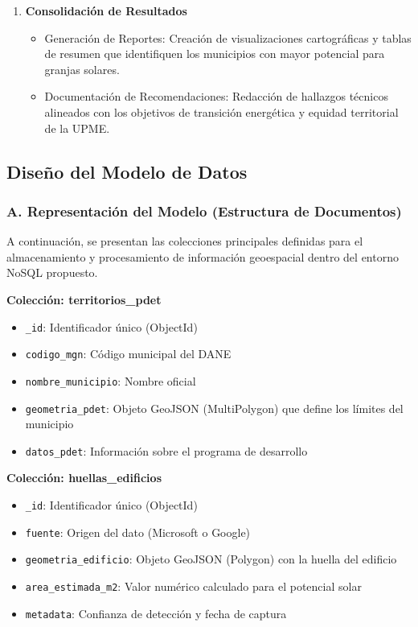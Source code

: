 \documentclass{article}
\begin{document}
\begin{enumerate}
    \item \textbf{Consolidación de Resultados}
    \begin{itemize}
        \item Generación de Reportes: Creación de visualizaciones cartográficas y tablas de resumen que identifiquen los municipios con mayor potencial para granjas solares.
        \item Documentación de Recomendaciones: Redacción de hallazgos técnicos alineados con los objetivos de transición energética y equidad territorial de la UPME.
    \end{itemize}
\end{enumerate}

\subsection{Diseño del Modelo de Datos}

\subsubsection{A. Representación del Modelo (Estructura de Documentos)}

A continuación, se presentan las colecciones principales definidas para el almacenamiento y procesamiento de información geoespacial dentro del entorno NoSQL propuesto.

\textbf{Colección: territorios\_pdet}

\begin{itemize}
    \item \texttt{\_id}: Identificador único (ObjectId)
    \item \texttt{codigo\_mgn}: Código municipal del DANE
    \item \texttt{nombre\_municipio}: Nombre oficial
    \item \texttt{geometria\_pdet}: Objeto GeoJSON (MultiPolygon) que define los límites del municipio
    \item \texttt{datos\_pdet}: Información sobre el programa de desarrollo
\end{itemize}

\textbf{Colección: huellas\_edificios}
\begin{itemize}
    \item \texttt{\_id}: Identificador único (ObjectId)
    \item \texttt{fuente}: Origen del dato (Microsoft o Google)
    \item \texttt{geometria\_edificio}: Objeto GeoJSON (Polygon) con la huella del edificio
    \item \texttt{area\_estimada\_m2}: Valor numérico calculado para el potencial solar
    \item \texttt{metadata}: Confianza de detección y fecha de captura
\end{itemize}
\end{document}
